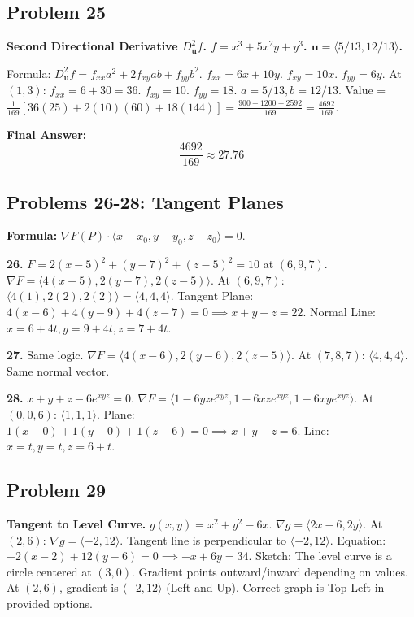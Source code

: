 \documentclass{article}
\begin{document}
\hrulefill

\subsection*{Problem 25}
\textbf{Second Directional Derivative $D_{\mathbf{u}}^2 f$. $f = x^3 + 5x^2y + y^3$. $\mathbf{u} = \langle 5/13, 12/13 \rangle$.}

Formula: $D_{\mathbf{u}}^2 f = f_{xx}a^2 + 2f_{xy}ab + f_{yy}b^2$.
$f_{xx} = 6x + 10y$. $f_{xy} = 10x$. $f_{yy} = 6y$.
At $(1, 3)$:
$f_{xx} = 6 + 30 = 36$.
$f_{xy} = 10$.
$f_{yy} = 18$.
$a = 5/13, b = 12/13$.
Value = $\frac{1}{169} [ 36(25) + 2(10)(60) + 18(144) ] = \frac{900 + 1200 + 2592}{169} = \frac{4692}{169}$.

\textbf{Final Answer:}
\[ \boxed{\frac{4692}{169}} \approx 27.76 \]

\hrulefill

\subsection*{Problems 26-28: Tangent Planes}
\textbf{Formula:} $\nabla F(P) \cdot \langle x-x_0, y-y_0, z-z_0 \rangle = 0$.

\textbf{26.} $F = 2(x-5)^2 + (y-7)^2 + (z-5)^2 = 10$ at $(6, 9, 7)$.
$\nabla F = \langle 4(x-5), 2(y-7), 2(z-5) \rangle$.
At $(6, 9, 7)$: $\langle 4(1), 2(2), 2(2) \rangle = \langle 4, 4, 4 \rangle$.
Tangent Plane: $4(x-6) + 4(y-9) + 4(z-7) = 0 \implies x+y+z = 22$.
Normal Line: $x=6+4t, y=9+4t, z=7+4t$.

\textbf{27.} Same logic. $\nabla F = \langle 4(x-6), 2(y-6), 2(z-5) \rangle$. At $(7, 8, 7)$: $\langle 4, 4, 4 \rangle$.
Same normal vector.

\textbf{28.} $x+y+z - 6e^{xyz} = 0$.
$\nabla F = \langle 1 - 6yz e^{xyz}, 1 - 6xz e^{xyz}, 1 - 6xy e^{xyz} \rangle$.
At $(0, 0, 6)$: $\langle 1, 1, 1 \rangle$.
Plane: $1(x-0) + 1(y-0) + 1(z-6) = 0 \implies x+y+z=6$.
Line: $x=t, y=t, z=6+t$.

\hrulefill

\subsection*{Problem 29}
\textbf{Tangent to Level Curve.}
$g(x, y) = x^2 + y^2 - 6x$. $\nabla g = \langle 2x-6, 2y \rangle$.
At $(2, 6)$: $\nabla g = \langle -2, 12 \rangle$.
Tangent line is perpendicular to $\langle -2, 12 \rangle$. Equation: $-2(x-2) + 12(y-6) = 0 \implies -x + 6y = 34$.
Sketch: The level curve is a circle centered at $(3, 0)$. Gradient points outward/inward depending on values. At $(2, 6)$, gradient is $\langle -2, 12 \rangle$ (Left and Up).
Correct graph is Top-Left in provided options.
\end{document}
